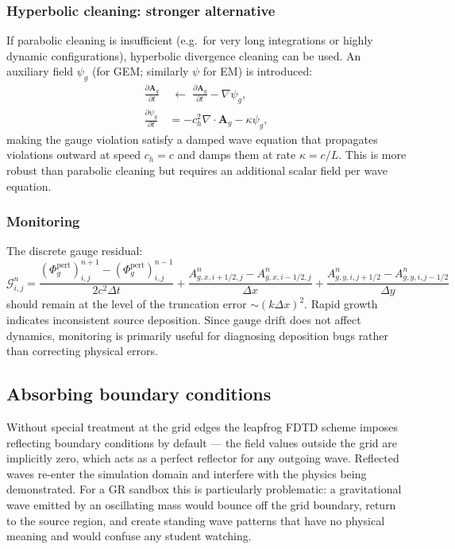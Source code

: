 \documentclass[11pt,a4paper]{article}
\newcommand{\vv}[1]{\mathbf{#1}}
\newcommand{\Phig}{\Phi_g}
\newcommand{\Ag}{\vv{A}_g}
\begin{document}
\subsubsection*{Hyperbolic cleaning: stronger alternative}

If parabolic cleaning is insufficient (e.g.\ for very long integrations or highly dynamic configurations), hyperbolic divergence cleaning can be used.  An auxiliary field $\psi_g$ (for GEM; similarly $\psi$ for EM) is introduced:
\begin{align}
  \frac{\partial\Ag}{\partial t} &\;\leftarrow\; \frac{\partial\Ag}{\partial t} - \nabla\psi_g, \\
  \frac{\partial\psi_g}{\partial t} &= -c_h^2\nabla\cdot\Ag - \kappa\psi_g,
\end{align}
making the gauge violation satisfy a damped wave equation that propagates violations outward at speed $c_h = c$ and damps them at rate $\kappa = c/L$.  This is more robust than parabolic cleaning but requires an additional scalar field per wave equation.

\subsubsection*{Monitoring}

The discrete gauge residual:
\begin{equation}
  \mathcal{G}_{i,j}^n = \frac{(\Phig^{\mathrm{pert}})_{i,j}^{n+1} - (\Phig^{\mathrm{pert}})_{i,j}^{n-1}}{2c^2\Delta t}
  + \frac{A_{g,x,i+1/2,j}^n - A_{g,x,i-1/2,j}^n}{\Delta x}
  + \frac{A_{g,y,i,j+1/2}^n - A_{g,y,i,j-1/2}^n}{\Delta y}
\end{equation}
should remain at the level of the truncation error $\sim(k\Delta x)^2$.  Rapid growth indicates inconsistent source deposition.  Since gauge drift does not affect dynamics, monitoring is primarily useful for diagnosing deposition bugs rather than correcting physical errors.

\subsection{Absorbing boundary conditions}
\label{sec:abc}

Without special treatment at the grid edges the leapfrog FDTD scheme imposes reflecting boundary conditions by default --- the field values outside the grid are implicitly zero, which acts as a perfect reflector for any outgoing wave.  Reflected waves re-enter the simulation domain and interfere with the physics being demonstrated.  For a GR sandbox this is particularly problematic: a gravitational wave emitted by an oscillating mass would bounce off the grid boundary, return to the source region, and create standing wave patterns that have no physical meaning and would confuse any student watching.
\end{document}
